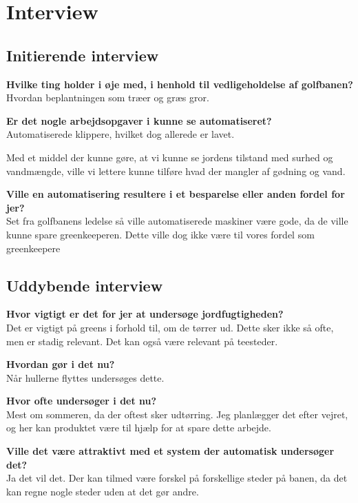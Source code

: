 \chapter{Interview} \label{cha:interviewKim}
\section*{Initierende interview}
\textbf{Hvilke ting holder i øje med, i henhold til vedligeholdelse af golfbanen?}\\
Hvordan beplantningen som træer og græs gror.

\textbf{Er det nogle arbejdsopgaver i kunne se automatiseret?}\\
Automatiserede klippere, hvilket dog allerede er lavet.

Med et middel der kunne gøre, at vi kunne se jordens tilstand med surhed og vandmængde, ville vi lettere kunne tilføre hvad der mangler af gødning og vand.

\textbf{Ville en automatisering resultere i et besparelse eller anden fordel for jer?}\\

Set fra golfbanens ledelse så ville automatiserede maskiner være gode, da de ville kunne spare greenkeeperen.
Dette ville dog ikke være til vores fordel som greenkeepere

\section*{Uddybende interview}

\textbf{Hvor vigtigt er det for jer at undersøge jordfugtigheden?}\\
Det er vigtigt på greens i forhold til, om de tørrer ud. Dette sker ikke så ofte, men er stadig relevant.
Det kan også være relevant på teesteder.

\textbf{Hvordan gør i det nu?}\\
Når hullerne flyttes undersøges dette.

\textbf{Hvor ofte undersøger i det nu?}\\
Mest om sommeren, da der oftest sker udtørring. Jeg planlægger det efter vejret, og her kan produktet være til hjælp for at spare dette arbejde.

\textbf{Ville det være attraktivt med et system der automatisk undersøger det?}\\
Ja det vil det. Der kan tilmed være forskel på forskellige steder på banen, da det kan regne nogle steder uden at det gør andre.

